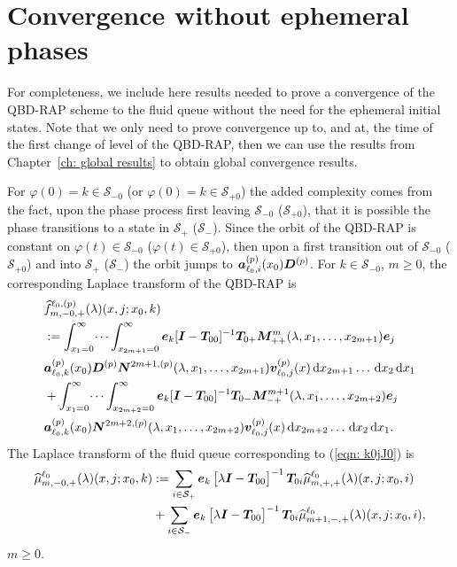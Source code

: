 \chapter{Convergence without ephemeral phases\label{app:extend conv}}
For completeness, we include here results needed to prove a convergence of the QBD-RAP scheme to the fluid queue without the need for the ephemeral initial states. Note that we only need to prove convergence up to, and at, the time of the first change of level of the QBD-RAP, then we can use the results from Chapter~\ref{ch: global results} to obtain global convergence results. 

For \(\varphi(0)=k\in\mathcal S_{-0}\) (or \(\varphi(0)=k\in\mathcal S_{+0}\)) the added complexity comes from the fact, upon the phase process first leaving \(\mathcal S_{-0}\) (\(\mathcal S_{+0}\)), that it is possible the phase transitions to a state in \(\mathcal S_+\) (\(\mathcal S_-\)). Since the orbit of the QBD-RAP is constant on \(\varphi(t)\in\mathcal S_{-0}\) (\(\varphi(t)\in\mathcal S_{+0}\)), then upon a first transition out of \(\mathcal S_{-0}\) (\(\mathcal S_{+0}\)) and into \(\mathcal S_+\) (\(\mathcal S_-\)) the orbit jumps to \(\boldsymbol   a_{\ell_0,i}^{(p)}(x_0)\boldsymbol D^{(p)}\). For \(k\in\mathcal S_{-0}\), \(m\geq 0\), the corresponding Laplace transform of the QBD-RAP is
\begin{align}
	&\widehat{f}_{m,-0,+}^{\ell_0,(p)}(\lambda)(x,j;x_0,k)\nonumber 
	\\&:=\int_{x_1=0}^\infty \dots \int_{x_{2m+1}=0}^\infty  \boldsymbol e_k [\boldsymbol I - \boldsymbol T_{00}]^{-1}\boldsymbol T_{0+}\boldsymbol M^m_{++}(\lambda,x_1,\dots,x_{2m+1})\boldsymbol e_j \nonumber
	\\& \boldsymbol a_{\ell_0,k}^{(p)}(x_0) \boldsymbol D^{(p)} \boldsymbol N^{2m+1,(p)}(\lambda,x_1,\dots,x_{2m+1}) {\boldsymbol v}_{\ell_0,j}^{(p)}(x)\, \mathrm{d} x_{2m+1}\dots\, \mathrm{d} x_2 \, \mathrm{d} x_1  \nonumber
	\\& + \int_{x_1=0}^\infty \dots \int_{x_{2m+2}=0}^\infty  \boldsymbol e_k [\boldsymbol I - \boldsymbol T_{00}]^{-1}\boldsymbol T_{0-}\boldsymbol M^{m+1}_{-+}(\lambda,x_1,\dots,x_{2m+2})\boldsymbol e_j \nonumber
	\\& \boldsymbol a_{\ell_0,k}^{(p)}(x_0)\boldsymbol N^{2m+2,(p)}(\lambda,x_1,\dots,x_{2m+2}) {\boldsymbol v}_{\ell_0,j}^{(p)}(x)\, \mathrm{d} x_{2m+2}\dots\, \mathrm{d} x_2 \, \mathrm{d} x_1.
	\label{eqn: k0jJ0}
\end{align}
The Laplace transform of the fluid queue corresponding to (\ref{eqn: k0jJ0}) is 
\begin{align}  
	\widehat \mu_{m,-0,+}^{\ell_0}(\lambda)(x,j;x_0,k) \nonumber 
	&:= \sum_{i\in\mathcal{S}_+}\boldsymbol e_k\begin{bmatrix} \lambda \boldsymbol I - \boldsymbol T_{00} \end{bmatrix}^{-1}\boldsymbol T_{0i}\widehat \mu_{m,+,+}^{\ell_0}(\lambda)(x,j;x_0,i) 
	\\&{}+ \sum_{i\in\mathcal{S}_-}\boldsymbol e_k\begin{bmatrix} \lambda \boldsymbol I - \boldsymbol T_{00} \end{bmatrix}^{-1}\boldsymbol T_{0i}\widehat \mu_{m+1,-,+}^{\ell_0}(\lambda)(x,j;x_0,i), \label{eqn: s0- actual}
\end{align}
\(m\geq 0\).

